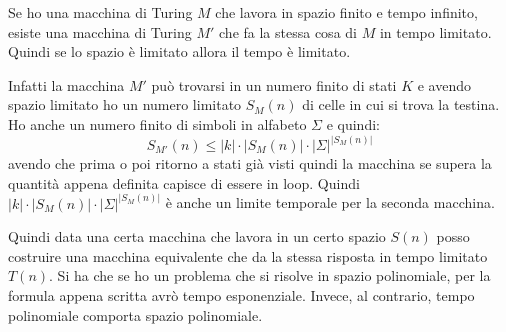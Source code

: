 \begin{teorema}
    Se ho una macchina di Turing $M$ che lavora in spazio finito e tempo infinito,
    esiste una macchina di Turing $M'$ che fa la stessa cosa di $M$ in tempo
    limitato. Quindi se lo spazio è limitato allora il tempo è limitato.
\end{teorema}
\begin{dimostrazione}
    Infatti la macchina $M'$ può trovarsi in un numero finito di stati $K$ e
    avendo spazio limitato ho un numero limitato $S_M(n)$ di celle in cui si trova
    la testina. Ho anche un numero finito di simboli in alfabeto $\Sigma$ e quindi:
    \begin{equation}
        S_{M'}(n) \leq |k| \cdot |S_M(n)| \cdot |\Sigma|^{|S_M(n)|}
    \end{equation}
    avendo che prima o poi ritorno a stati già visti quindi la macchina se supera
    la quantità appena definita capisce di essere in loop. Quindi
    $|k| \cdot |S_M(n)| \cdot |\Sigma|^{|S_M(n)|}$ è anche un limite temporale
    per la seconda macchina.
\end{dimostrazione}
Quindi data una certa macchina che lavora in un certo spazio $S(n)$ posso costruire
una macchina equivalente che da la stessa risposta in tempo limitato $T(n)$. Si ha
che se ho un problema che si risolve in spazio polinomiale, per la formula appena
scritta avrò tempo esponenziale. Invece, al contrario, tempo polinomiale comporta
spazio polinomiale.
